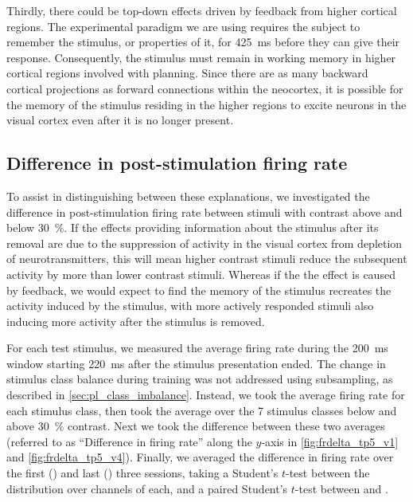 Thirdly, there could be top-down effects driven by feedback from higher cortical regions.
The experimental paradigm we are using requires the subject to remember the stimulus, or properties of it, for \SI{425}{\milli\second} before they can give their response.
Consequently, the stimulus must remain in working memory in higher cortical regions involved with planning.
Since there are as many backward cortical projections as forward connections within the neocortex, it is possible for the memory of the stimulus residing in the higher regions to excite neurons in the visual cortex even after it is no longer present.


\subsection{Difference in post-stimulation firing rate}

To assist in distinguishing between these explanations, we investigated the difference in post-stimulation firing rate between stimuli with contrast above and below \SI{30}{\percent}.
If the effects providing information about the stimulus after its removal are due to the suppression of activity in the visual cortex from depletion of neurotransmitters, this will mean higher contrast stimuli reduce the subsequent activity by more than lower contrast stimuli.
Whereas if the the effect is caused by feedback, we would expect to find the memory of the stimulus recreates the activity induced by the stimulus, with more actively responded stimuli also inducing more activity after the stimulus is removed.

For each test stimulus, we measured the average firing rate during the \SI{200}{\milli\second} window starting \SI{220}{\milli\second} after the stimulus presentation ended.
The change in stimulus class balance during training was not addressed using subsampling, as described in \autoref{sec:pl_class_imbalance}.
Instead, we took the average firing rate for each stimulus class, then took the average over the \num{7} stimulus classes below and above \SI{30}{\percent} contrast.
Next we took the difference between these two averages (referred to as ``Difference in firing rate'' along the $y$-axis in \autoref{fig:frdelta_tp5_v1} and \autoref{fig:frdelta_tp5_v4}).
Finally, we averaged the difference in firing rate over the first () and last () three sessions, taking a Student's $t$-test between the distribution over channels of each, and a paired Student's $t$-test between  and .

